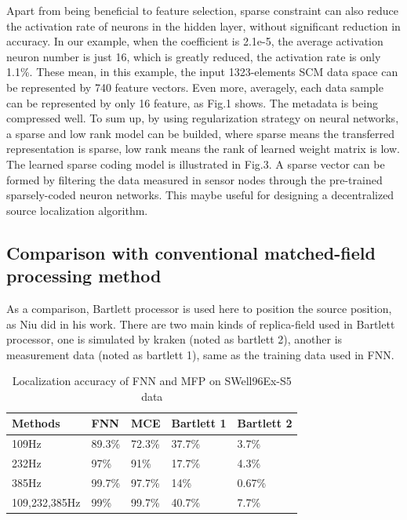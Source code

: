 Apart from being beneficial to feature selection, sparse constraint can also reduce the activation rate of neurons in the hidden layer, without significant reduction in accuracy. In our example, when the coefficient is 2.1e-5, the average activation neuron number is just 16, which is greatly reduced, the activation rate is only 1.1{\%}.
These mean, in this example, the input 1323-elements SCM  data space can be represented by 740 feature vectors. Even more, averagely, each data sample can be represented by only 16 feature, as Fig.1 shows. The metadata is being compressed well. To sum up, by using regularization strategy on neural networks, a sparse and low rank model can be builded, where sparse means the transferred representation is sparse, low rank means the rank of learned weight matrix is low. The learned sparse coding model is illustrated in Fig.3.
A sparse vector can be formed by filtering the data measured in sensor nodes through the pre-trained sparsely-coded neuron networks. 
This maybe useful for designing a decentralized source localization algorithm.%

\subsection{Comparison with conventional matched-field processing method}
As a comparison, Bartlett processor is used here to position the source position, as Niu did in his work. There are two main kinds of replica-field used in Bartlett processor, one is simulated by kraken (noted as bartlett 2), another is measurement data (noted as bartlett 1), same as the training data used in FNN.
\begin{table}[]
\caption{Localization accuracy of FNN and MFP on SWell96Ex-S5 data}
\label{my-label}
\begin{tabular}{@{}lllll@{}}
\toprule
Methods       & FNN    & MCE    & Bartlett 1 & Bartlett 2 \\ \midrule
109Hz         & 89.3\% & 72.3\% & 37.7\%     & 3.7\%      \\
232Hz         & 97\%   & 91\%   & 17.7\%     & 4.3\%      \\
385Hz         & 99.7\% & 97.7\% & 14\%       & 0.67\%     \\
109,232,385Hz & 99\%   & 99.7\% & 40.7\%     & 7.7\%      \\ \bottomrule
\end{tabular}
\end{table}

